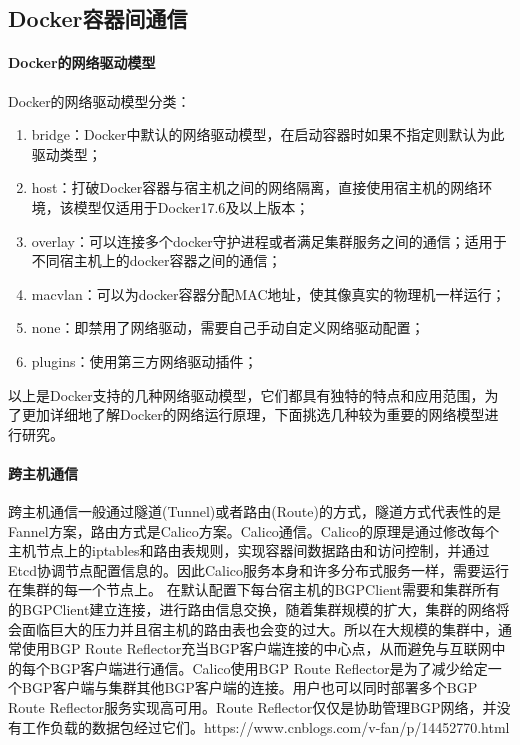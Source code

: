 \documentclass[../../../interview-questions.tex]{subfiles}
\begin{document}
\subsection{Docker容器间通信}

\paragraph{Docker的网络驱动模型}

Docker的网络驱动模型分类：

\begin{enumerate}
    \item {bridge：Docker中默认的网络驱动模型，在启动容器时如果不指定则默认为此驱动类型；}
    \item {host：打破Docker容器与宿主机之间的网络隔离，直接使用宿主机的网络环境，该模型仅适用于Docker17.6及以上版本；}
    \item {overlay：可以连接多个docker守护进程或者满足集群服务之间的通信；适用于不同宿主机上的docker容器之间的通信；}
    \item {macvlan：可以为docker容器分配MAC地址，使其像真实的物理机一样运行；}
    \item {none：即禁用了网络驱动，需要自己手动自定义网络驱动配置；}
    \item {plugins：使用第三方网络驱动插件；}
\end{enumerate}

以上是Docker支持的几种网络驱动模型，它们都具有独特的特点和应用范围，为了更加详细地了解Docker的网络运行原理，下面挑选几种较为重要的网络模型进行研究。

\paragraph{跨主机通信}

跨主机通信一般通过隧道(Tunnel)或者路由(Route)的方式，隧道方式代表性的是Fannel方案，路由方式是Calico方案。Calico通信。Calico的原理是通过修改每个主机节点上的iptables和路由表规则，实现容器间数据路由和访问控制，并通过Etcd协调节点配置信息的。因此Calico服务本身和许多分布式服务一样，需要运行在集群的每一个节点上。
在默认配置下每台宿主机的BGPClient需要和集群所有的BGPClient建立连接，进行路由信息交换，随着集群规模的扩大，集群的网络将会面临巨大的压力并且宿主机的路由表也会变的过大。所以在大规模的集群中，通常使用BGP Route Reflector充当BGP客户端连接的中心点，从而避免与互联网中的每个BGP客户端进行通信。Calico使用BGP Route Reflector是为了减少给定一个BGP客户端与集群其他BGP客户端的连接。用户也可以同时部署多个BGP Route Reflector服务实现高可用。Route Reflector仅仅是协助管理BGP网络，并没有工作负载的数据包经过它们。https://www.cnblogs.com/v-fan/p/14452770.html
\end{document}
